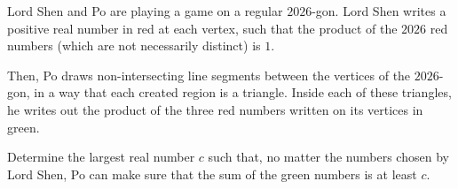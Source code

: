 Lord Shen and Po are playing a game on a regular $2026$-gon.
Lord Shen writes a positive real number in red at each vertex,
such that the product of the $2026$ red numbers (which are not necessarily distinct) is $1$. 
    
Then, Po draws non-intersecting line segments between the vertices of the $2026$-gon,
in a way that each created region is a triangle.
Inside each of these triangles,
he writes out the product of the three red numbers written on its vertices in green.

Determine the largest real number $c$ such that,
no matter the numbers chosen by Lord Shen,
Po can make sure that the sum of the green numbers is at least $c$. 
